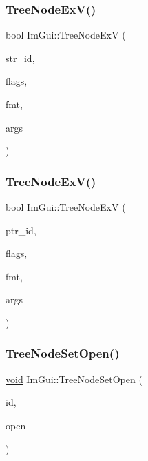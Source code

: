 \mbox{\label{namespaceImGui_a251cd4acbdad4cef2246d9b573a83ce0}} 
\subsubsection{\texorpdfstring{Tree\+Node\+Ex\+V()}{TreeNodeExV()}\hspace{0.1cm}{\footnotesize\ttfamily [1/2]}}
{\footnotesize\ttfamily bool Im\+Gui\+::\+Tree\+Node\+ExV (\begin{DoxyParamCaption}\item[{const char $\ast$}]{str\+\_\+id,  }\item[{Im\+Gui\+Tree\+Node\+Flags}]{flags,  }\item[{const char $\ast$}]{fmt,  }\item[{va\+\_\+list}]{args }\end{DoxyParamCaption})}

\mbox{\label{namespaceImGui_aaae827898572d17e064a88a1afc8e6b0}} 
\subsubsection{\texorpdfstring{Tree\+Node\+Ex\+V()}{TreeNodeExV()}\hspace{0.1cm}{\footnotesize\ttfamily [2/2]}}
{\footnotesize\ttfamily bool Im\+Gui\+::\+Tree\+Node\+ExV (\begin{DoxyParamCaption}\item[{const \hyperlink{imgui__impl__opengl3__loader_8h_ac668e7cffd9e2e9cfee428b9b2f34fa7}{void} $\ast$}]{ptr\+\_\+id,  }\item[{Im\+Gui\+Tree\+Node\+Flags}]{flags,  }\item[{const char $\ast$}]{fmt,  }\item[{va\+\_\+list}]{args }\end{DoxyParamCaption})}

\mbox{\label{namespaceImGui_ad27861dfbbbef294034215acb3834125}} 
\subsubsection{\texorpdfstring{Tree\+Node\+Set\+Open()}{TreeNodeSetOpen()}}
{\footnotesize\ttfamily \hyperlink{imgui__impl__opengl3__loader_8h_ac668e7cffd9e2e9cfee428b9b2f34fa7}{void} Im\+Gui\+::\+Tree\+Node\+Set\+Open (\begin{DoxyParamCaption}\item[{Im\+Gui\+ID}]{id,  }\item[{bool}]{open }\end{DoxyParamCaption})}

